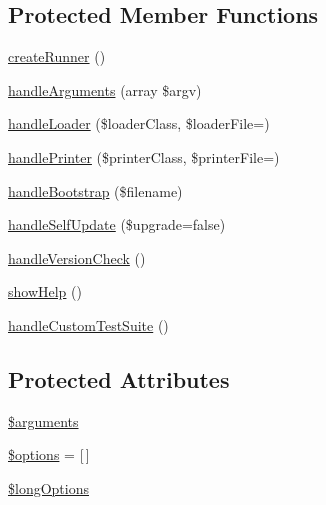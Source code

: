 \subsection*{Protected Member Functions}
\begin{DoxyCompactItemize}
\item 
\mbox{\hyperlink{class_p_h_p_unit___text_u_i___command_a16a628a086f941d2a00d4cde917d1251}{create\+Runner}} ()
\item 
\mbox{\hyperlink{class_p_h_p_unit___text_u_i___command_aa31f6317c1f043c16d7524024ecc9445}{handle\+Arguments}} (array \$argv)
\item 
\mbox{\hyperlink{class_p_h_p_unit___text_u_i___command_aaea6080accfabc612f819580be15a3d4}{handle\+Loader}} (\$loader\+Class, \$loader\+File=\textquotesingle{}\textquotesingle{})
\item 
\mbox{\hyperlink{class_p_h_p_unit___text_u_i___command_a8e4a50d2ec53027d3621bd3beb3d9eb1}{handle\+Printer}} (\$printer\+Class, \$printer\+File=\textquotesingle{}\textquotesingle{})
\item 
\mbox{\hyperlink{class_p_h_p_unit___text_u_i___command_a5180182e50fae4b44de58f4c0f68e81d}{handle\+Bootstrap}} (\$filename)
\item 
\mbox{\hyperlink{class_p_h_p_unit___text_u_i___command_ac44fe359d84a50430f972272158e018d}{handle\+Self\+Update}} (\$upgrade=false)
\item 
\mbox{\hyperlink{class_p_h_p_unit___text_u_i___command_a475024c68c7cb509672c0bab39d68f98}{handle\+Version\+Check}} ()
\item 
\mbox{\hyperlink{class_p_h_p_unit___text_u_i___command_a258bf9304a3fd9d40d1894a7339eb90f}{show\+Help}} ()
\item 
\mbox{\hyperlink{class_p_h_p_unit___text_u_i___command_ab8abd5b6bb82eb8fcf573f5c7b03d012}{handle\+Custom\+Test\+Suite}} ()
\end{DoxyCompactItemize}
\subsection*{Protected Attributes}
\begin{DoxyCompactItemize}
\item 
\mbox{\hyperlink{class_p_h_p_unit___text_u_i___command_a61eded163d962fc248b3cf209000979b}{\$arguments}}
\item 
\mbox{\hyperlink{class_p_h_p_unit___text_u_i___command_a011800c63ece4cbbfa77136a20607023}{\$options}} = \mbox{[}$\,$\mbox{]}
\item 
\mbox{\hyperlink{class_p_h_p_unit___text_u_i___command_a1b74a8af2115a39559e9994778a567c3}{\$long\+Options}}
\end{DoxyCompactItemize}


